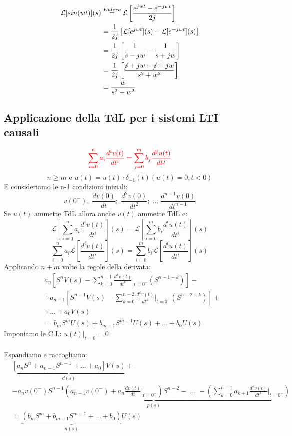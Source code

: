 \documentclass[a4paper]{article}
\theoremstyle{definition}
\theoremstyle{remark}
\begin{document}
\begin{align*}
    \mathcal{L}[sin(wt)](s) &\stackrel{Eulero}{=} \mathcal{L}\left[\frac{e^{jwt} - e^{-jwt}}{2j}\right]\\
    &= \frac{1}{2j}\left[\mathcal{L}[e^{jwt}](s) - \mathcal{L}[e^{-jwt}](s)\right] \\
    &= \frac{1}{2j}\left[\frac{1}{s-jw} - \frac{1}{s+jw}\right] \\
    &= \frac{1}{2j}\left[\frac{\cancel{s}+jw - \cancel{s}+jw}{s^2 + w^2}\right] \\
    &= \frac{w}{s^2 + w^2}
\end{align*}

\subsection{Applicazione della TdL per i sistemi LTI causali}
\begin{equation*}
    \color{red}
    \sum_{i=0}^{n} a_i \frac{d^iv(t)}{dt^i} = \sum_{j=0}^{m} b_j \frac{d^ju(t)}{dt^j}
\end{equation*}
\[n \ge m \text{ e } u(t) = u(t)\cdot \delta_{-1}(t) (u(t)=0, t<0)\]
E consideriamo le n-1 condizioni iniziali:
\[v(0^-), \; \frac{dv(0)}{dt}; \; \frac{d^2v(0)}{dt^2}; \; \dots \; \frac{d^{n-1}v(0)}{dt^{n-1}}\]
Se $u(t)$ ammette TdL allora anche $v(t)$ ammette TdL e:
\begin{equation*}
    \mathcal{L}\left[\sum_{i=0}^{n} a_i \frac{d^iv(t)}{dt^i}\right](s) = \mathcal{L}\left[\sum_{i=0}^{m} b_i \frac{d^iu(t)}{dt^i}\right](s)
\end{equation*}
\begin{equation*}
    \sum_{i=0}^{n} a_i \mathcal{L}\left[\frac{d^iv(t)}{dt^i}\right](s) = \sum_{i=0}^{m} b_i \mathcal{L}\left[\frac{d^iu(t)}{dt^i}\right](s)
\end{equation*}
Applicando $n+m$ volte la regole della derivata:\\
\begin{align*}
   &a_n\left[S^nV(s) - \sum_{k=0}^{n-1}\frac{d^kv(t)}{dt^k}\bigg|_{t=0^-}(S^{n-1-k})\right] + \\
   &+ a_{n-1}\left[S^{n-1}V(s) - \sum_{k=0}^{n-2}\frac{d^kv(t)}{dt^k}\bigg|_{t=0^-}(S^{n-2-k})\right] +\\
   &+ \dots + a_0V(s)\\
   &= b_mS^mU(s) + b_{m-1}S^{m-1}U(s) + \dots + b_0U(s)
\end{align*}
Imponiamo le C.I.: $u(t)\bigg|_{t=0} = 0$\\\\
Espandiamo e raccogliamo:
\begin{align*}
    &\underbrace{\left[a_nS^n + a_{n-1}S^{n-1} + \dots + a_0\right]V(s)}_{d(s)} +\\
    &- \underbrace{a_nv(0^-)S^{n-1}\left(a_{n-1}v(0^-) + a_n\frac{dv(t)}{dt}\bigg|_{t=0^-}\right)S^{n-2} - \; \dots \; - \left(\sum_{k=0}^{n-1} a_{k+1} \frac{d^kv(t)}{dt^k}\bigg|_{t=0^-}\right)}_{p(s)}\\
    &= \underbrace{(b_mS^m + b_{m-1}S^{m-1} + \dots + b_0)}_{n(s)}U(s)
\end{align*}
\end{document}
